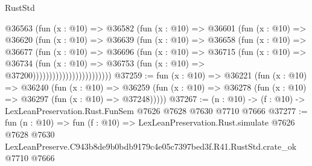 \begin{lexlean}{RustStd}
\begin{coremodule}
                            @36563
                              (fun (x : @10) =>
                              @36582
                                (fun (x : @10) =>
                                @36601
                                  (fun (x : @10) =>
                                  @36620
                                    (fun (x : @10) =>
                                    @36639
                                      (fun (x : @10) =>
                                      @36658
                                        (fun (x : @10) =>
                                        @36677
                                          (fun (x : @10) =>
                                          @36696
                                            (fun (x : @10) =>
                                            @36715
                                              (fun (x : @10) =>
                                              @36734
                                                (fun (x : @10) =>
                                                @36753
                                                  (fun (x : @10) => @37200))))))))))))))))))))))))
@37259 := fun (x : @10) =>
  @36221
    (fun (x : @10) =>
    @36240
      (fun (x : @10) =>
      @36259 (fun (x : @10) => @36278 (fun (x : @10) => @36297 (fun (x : @10) => @37248)))))
@37267 := (n : @10) -> (f : @10) -> LexLeanPreservation.Rust.FunSem @7626 @7628 @7630 @7710 @7666
@37277 := fun (n : @10) =>
  fun (f : @10) =>
  LexLeanPreservation.Rust.simulate
    @7626
    @7628
    @7630
    LexLeanPreserve.C943b8de9b0bdb9179c4e05c7397bed3f.R41.RustStd.crate_ok
    @7710
    @7666
\end{coremodule}
\end{lexlean}
